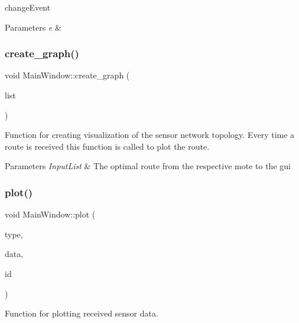 change\+Event 


\begin{DoxyParams}{Parameters}
{\em e} & \\
\hline
\end{DoxyParams}
\mbox{\label{classMainWindow_aa74278d87740ad86c6db91f071f7fd19}} 
\subsubsection{\texorpdfstring{create\+\_\+graph()}{create\_graph()}}
{\footnotesize\ttfamily void Main\+Window\+::create\+\_\+graph (\begin{DoxyParamCaption}\item[{Q\+String\+List}]{list }\end{DoxyParamCaption})\hspace{0.3cm}{\ttfamily [protected]}}



Function for creating visualization of the sensor network topology. Every time a route is received this function is called to plot the route. 


\begin{DoxyParams}{Parameters}
{\em Input\+List} & The optimal route from the respective mote to the gui \\
\hline
\end{DoxyParams}
\mbox{\label{classMainWindow_aef3981280b4d81ab4b880e435a992ebd}} 
\subsubsection{\texorpdfstring{plot()}{plot()}}
{\footnotesize\ttfamily void Main\+Window\+::plot (\begin{DoxyParamCaption}\item[{int}]{type,  }\item[{Q\+String\+List}]{data,  }\item[{Q\+String}]{id }\end{DoxyParamCaption})\hspace{0.3cm}{\ttfamily [protected]}}



Function for plotting received sensor data. 


